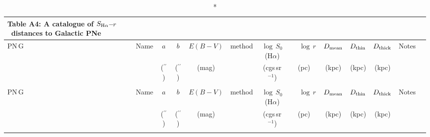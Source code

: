 \documentclass[useAMS]{mn2e}
\def\arcsec{\hbox{$^{\prime\prime}$}}
\def\SR{$S_{\rm H\alpha}$--$r$}
\begin{document}
\onecolumn


\begin{center}
{\scriptsize
\begin{longtable}{llccccccccccc}
\caption*{Table A4:  A catalogue of \SR\ distances to Galactic PNe}\\
\hline \noalign{\smallskip}
PN\,G & 
Name & 
$a$ &
$b$ &
$E(B-V)$ &
method &
$\log$\,$S_0$(H$\alpha$) &
~~$\log$\,$r$~~  &
$D_{\rm mean}$ &
$D_{\rm thin}$&
$D_{\rm thick}$&
Notes \\
		&
		&
(\arcsec)	& 
(\arcsec)	& 
(mag)	&
		&
(cgs\,sr$^{-1}$)	&
(pc)		&
(kpc)		&
(kpc)		&
(kpc)		&
		&
\\
\hline \noalign{\smallskip}
\endfirsthead
\multicolumn{10}{c}{{}} \\
\hline \noalign{\smallskip}
PN\,G & 
Name & 
$a$&
$b$ &
$E(B-V)$ &
method &
$\log$\,$S_0$(H$\alpha$) &
~~$\log$\,$r$~~  &
$D_{\rm mean}$ &
$D_{\rm thin}$&
$D_{\rm thick}$&
Notes \\
		&
		&
(\arcsec)	& 
(\arcsec)	& 
(mag)	&
		&
(cgs\,sr$^{-1}$)	&
(pc)		&
(kpc)		&
(kpc)		&
(kpc)		&
		&
\\
\hline \noalign{\smallskip}

\endhead
\hline \noalign{\smallskip}
\endfoot
\hline \noalign{\smallskip}
\endlastfoot


\end{longtable}}
\end{center}
\end{document}
